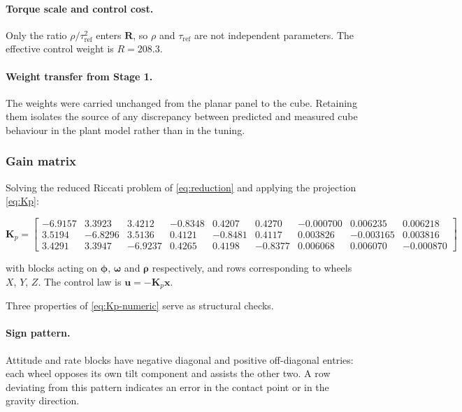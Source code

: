 \paragraph{Torque scale and control cost.} Only the ratio $\rho/\tau_{\mathrm{ref}}^2$
enters $\bm{R}$, so $\rho$ and $\tau_{\mathrm{ref}}$ are not independent
parameters. The effective control weight is $R = 208.3$.

\paragraph{Weight transfer from Stage 1.} The weights were carried unchanged
from the planar panel to the cube. Retaining them isolates the source of any
discrepancy between predicted and measured cube behaviour in the plant model
rather than in the tuning.

\subsubsection{Gain matrix}
\label{sec:gains}

Solving the reduced Riccati problem of \eqref{eq:reduction} and applying the
projection \eqref{eq:Kp}:

\begin{equation}
\bm{K}_p =
\left[\begin{array}{rrr|rrr|rrr}
 -6.9157 &  3.3923 &  3.4212 & -0.8348 &  0.4207 &  0.4270 & -0.000700 &  0.006235 &  0.006218\\
  3.5194 & -6.8296 &  3.5136 &  0.4121 & -0.8481 &  0.4117 &  0.003826 & -0.003165 &  0.003816\\
  3.4291 &  3.3947 & -6.9237 &  0.4265 &  0.4198 & -0.8377 &  0.006068 &  0.006070 & -0.000870
\end{array}\right]
\label{eq:Kp-numeric}
\end{equation}

\noindent
with blocks acting on $\bm{\phi}$, $\bm{\omega}$ and $\bm{\rho}$
respectively, and rows corresponding to wheels $X$, $Y$, $Z$. The control law
is $\bm{u} = -\bm{K}_p\bm{x}$.

Three properties of \eqref{eq:Kp-numeric} serve as structural checks.

\paragraph{Sign pattern.} Attitude and rate blocks have negative diagonal and
positive off-diagonal entries: each wheel opposes its own tilt component and
assists the other two. A row deviating from this pattern indicates an error
in the contact point or in the gravity direction.

